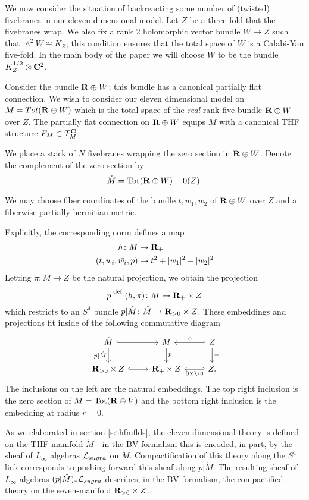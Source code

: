 \parsec[s:brfive]

We now consider the situation of backreacting some number of (twisted) fivebranes in our eleven-dimensional model.
Let $Z$ be a three-fold that the fivebranes wrap.
We also fix a rank 2 holomorphic vector bundle $W\to Z$ such that $\wedge^{2} W \cong K_{Z}$;
this condition ensures that the total space of $W$ is a Calabi-Yau five-fold. In the main body of the paper we will choose $W$ to be the bundle $K_{Z}^{1/2}\otimes \mathbf{C}^{2}$.

Consider the bundle $\mathbf{R}\oplus W$; this bundle has a canonical partially flat connection. We wish to consider our eleven dimensional model on $M = Tot (\mathbf{R}\oplus W)$ which is the total space of the \textit{real} rank five bundle $\mathbf{R}\oplus W$ over $Z$. The partially flat connection on $\mathbf{R}\oplus W$ equips $M$ with a canonical THF structure $F_{M}\subset T_{M}^{\mathbf{C}}$.

We place a stack of $N$ fivebranes wrapping the zero section in $\mathbf{R}\oplus W$.
Denote the complement of the zero section by
\[
\mathring{M} = \text{Tot}(\mathbf{R}\oplus W) - 0(Z).
\]

We may choose fiber coordinates of the bundle $t, w_{1}, w_{2}$ of $\mathbf{R} \oplus W$ over $Z$ and a fiberwise partially hermitian metric.

Explicitly, the corresponding norm defines a map
\begin{align*}
 h \colon  M & \to \mathbf{R}_{+} \\
  (t, w_{i}, \bar{w_{i}}, p)& \mapsto t^{2} + |w_{1}|^{2}+|w_{2}|^{2}
\end{align*}
Letting $\pi \colon M \to Z$ be the natural projection, we obtain the projection
\[
p \overset{\rm def}{=} (h,\pi) \colon M \to \mathbf{R}_{+}\times Z
\]
which restricts to an $S^4$ bundle $p|\mathring {M} \colon \mathring{M} \to \mathbf{R}_{>0} \times Z$.
These embeddings and projections fit inside of the following commutative diagram
\[
\begin{tikzcd}
\mathring{M} \ar[d,"p|\mathring M"'] \ar[r,hook] & M \ar[d,"p"] & \ar[l,hook',"0"'] Z \ar[d,"="] \\
\R_{>0} \times Z \ar[r,hook] & \R_{+} \times Z & \ar[l,hook',"0 \times \id"] Z.
\end{tikzcd}
\]
The inclusions on the left are the natural embeddings.
The top right inclusion is the zero section of $M = {\rm Tot}(\mathbf{R} \oplus V)$ and the bottom right inclusion is the embedding at radius $r = 0$.

As we elaborated in section \ref{s:thfmflds}, the eleven-dimensional theory is defined on the THF manifold $\mathring M$---in the BV formalism this is encoded, in part, by the sheaf of $L_\infty$ algebras $\mathcal L_{sugra}$ on $\mathring M$. Compactification of this theory along the $S^4$ link corresponds to pushing forward this sheaf along $p|\mathring M$. The resulting sheaf of $L_\infty$ algebras $(p|\mathring M)_*\mathcal L_{sugra}$ describes, in the BV formalism, the compactified theory on the seven-manifold $\mathbf{R}_{>0} \times Z$.

